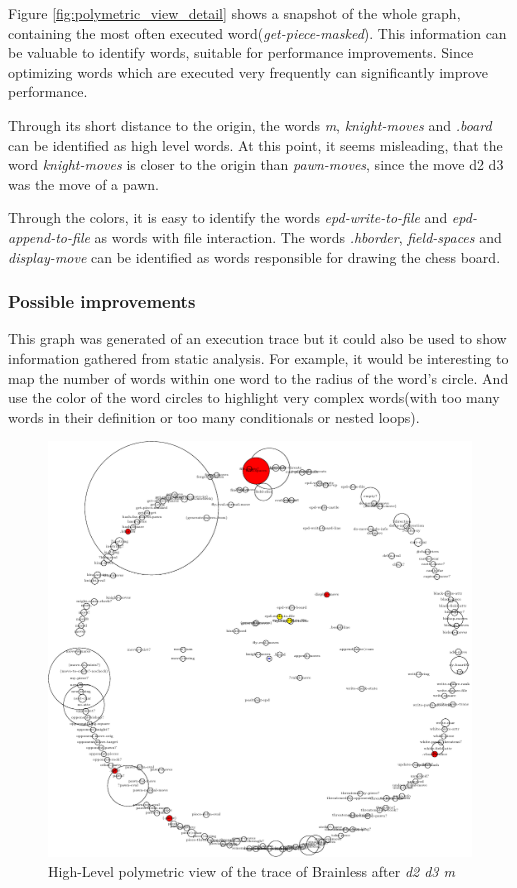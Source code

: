 Figure \ref{fig:polymetric_view_detail} shows a snapshot of the whole graph, containing the most often executed word(\emph{get-piece-masked}). This information can be valuable to identify words, suitable for performance improvements. Since optimizing words which are executed very frequently can significantly improve performance.

Through its short distance to the origin, the words \emph{m}, \emph{knight-moves} and \emph{.board} can be identified as high level words. At this point, it seems misleading, that the word \emph{knight-moves} is closer to the origin than \emph{pawn-moves}, since the move d2 d3 was the move of a pawn.

Through the colors, it is easy to identify the words \emph{epd-write-to-file} and \emph{epd-append-to-file} as words with file interaction. The words \emph{.hborder}, \emph{field-spaces} and \emph{display-move} can be identified as words responsible for drawing the chess board.

\subsubsection*{Possible improvements}

This graph was generated of an execution trace but it could also be used to show information gathered from static analysis. For example, it would be interesting to map the number of words within one word to the radius of the word's circle. And use the color of the word circles to highlight very complex words(with too many words in their definition or too many conditionals or nested loops).

\begin{figure}[p]
    \centering
    \includegraphics[scale=0.55]{graphics/polymetric_view.png}
    \caption{High-Level polymetric view of the trace of Brainless after \emph{d2 d3 m}}
    \label{fig:polymetric_view}
\end{figure}

